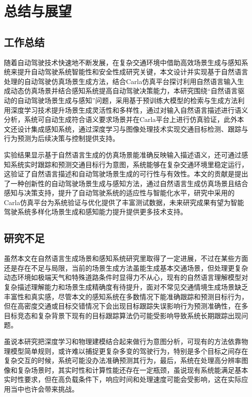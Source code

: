 \chapter{总结与展望}

\section{工作总结}

随着自动驾驶技术快速地不断发展，在复杂交通环境中借助高效场景生成与感知系统来提升自动驾驶系统智能性和安全性成研究关键，本文设计并实现基于自然语言处理的自动驾驶仿真场景生成方法，结合Carla仿真平台探讨利用自然语言输入生成动态仿真场景并结合感知系统提高自动驾驶决策能力，本研究围绕“自然语言驱动的自动驾驶场景生成与感知”问题，采用基于预训练大模型的检索与生成方法利用深度学习技术提升场景生成灵活性和多样性，通过对输入自然语言描述进行语义分析，系统可自动生成符合语义要求场景并在Carla平台上进行仿真验证，此外本文还设计集成感知系统，通过深度学习与图像处理技术实现交通目标检测、跟踪与行为预测为后续决策与控制提供支持。

实验结果显示基于自然语言生成的仿真场景能准确反映输入描述语义，还可通过感知系统实时跟踪和预测交通目标行为意图，系统能够在复杂交通环境里稳定运行，这验证了自然语言描述和自动驾驶场景生成的可行性与有效性。本文的贡献是提出了一种创新性的自动驾驶场景生成与感知方法，通过自然语言生成仿真场景且结合感知与决策支持，提升了自动驾驶系统的适应性与智能化水平，研究中采用的Carla仿真平台为系统验证与优化提供了丰富测试数据，未来研究成果有望为智能驾驶系统多样化场景生成和感知能力提升提供更多技术支持。

\section{研究不足}
虽然本文在自然语言生成场景和感知系统研究里取得了一定进展，不过在某些方面还是存在不足与局限，当前的场景生成方法虽能生成基本交通场景，但处理更复杂动态环境如极端天气和特殊道路条件时显得力不从心，现有的自然语言理解模型对复杂描述理解能力和场景生成精确度有待提升，面对不常见交通情境生成场景缺乏丰富性和真实感，尽管本文的感知系统在多数情况下能准确跟踪和预测目标行为，但在高密度交通或目标交错情况下会出现目标跟踪失误影响行为预测准确性，在多目标竞态和复杂背景下现有的目标跟踪算法仍可能受影响导致系统长期跟踪出现问题。

虽说本研究把深度学习和物理建模结合起来做行为意图分析，可现有的方法依靠物理模型简单规则，或许难以捕捉更复杂多变的驾驶行为，特别是多个目标之间存在复杂交互的时候，系统可能没办法准确预测其行为，最后，系统在处理高分辨率图像和复杂场景时，其实时性和计算性能还存在一定瓶颈，虽说现有系统能满足基本实时性要求，但在高负载条件下，响应时间和处理速度可能会受影响，这在实际应用当中也许会带来挑战。

